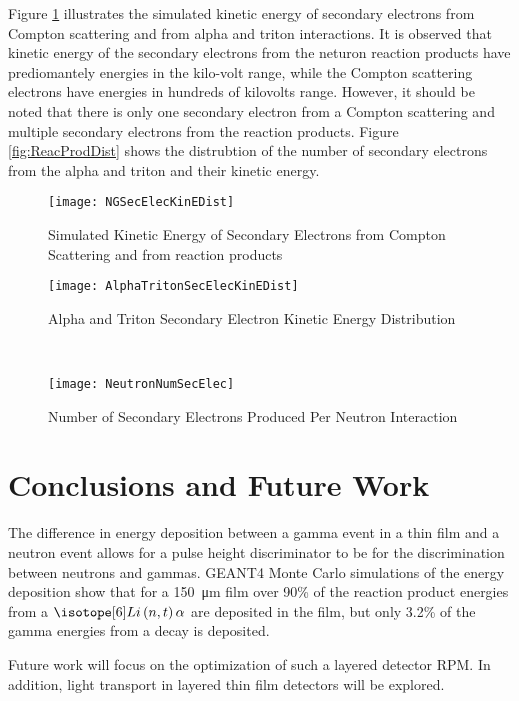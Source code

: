 \documentclass[draftcls,onecolumn]{IEEEtran}
\begin{document}
Figure \ref{fig:simKinE} illustrates the simulated kinetic energy of secondary electrons from Compton scattering and from alpha and triton interactions.
It is observed that kinetic energy of the secondary electrons from the neturon reaction products have prediomantely energies in the kilo-volt range, while the Compton scattering electrons have energies in hundreds of kilovolts range. 
However, it should be noted that there is only one secondary electron from a Compton scattering and multiple secondary electrons from the reaction products.
Figure \ref{fig:ReacProdDist} shows the distrubtion of the number of secondary electrons from the alpha and triton and their kinetic energy.
\begin{figure}[ht]
    \centering
    \texttt{[image: NGSecElecKinEDist]}
    \caption{Simulated Kinetic Energy of Secondary Electrons from Compton Scattering and from  reaction products}
    \label{fig:simKinE}
\end{figure}
\begin{figure*}[ht]
	\centering
	\begin{subfigure}[b]{0.45\textwidth}
    		\texttt{[image: AlphaTritonSecElecKinEDist]}
		\caption{Alpha and Triton Secondary Electron Kinetic Energy Distribution}
	\end{subfigure}%
	~
	\begin{subfigure}[b]{0.45\textwidth}
    		\texttt{[image: NeutronNumSecElec]}
		\caption{Number of Secondary Electrons Produced Per Neutron Interaction}
	\end{subfigure}%
	\caption{Neutron Reaction Products Secondary Electrons Energies}
	\label{fig:ReacProdDist}
\end{figure*}
\section{Conclusions and Future Work}
\label{sec:Conclusions}

The difference in energy deposition between a gamma event in a thin film and a neutron event allows for a pulse height discriminator to be for the discrimination between neutrons and gammas.
GEANT4 Monte Carlo simulations of the energy deposition show that for a \SI{150}{\um} film over 90\% of the reaction product energies from a $\iso[6]{Li}\left(n,t\right)\alpha$ are deposited in the film, but only 3.2\% of the gamma energies from a  decay is deposited.

Future work will focus on the optimization of such a layered detector RPM.
In addition, light transport in layered thin film detectors will be explored.


\end{document}
